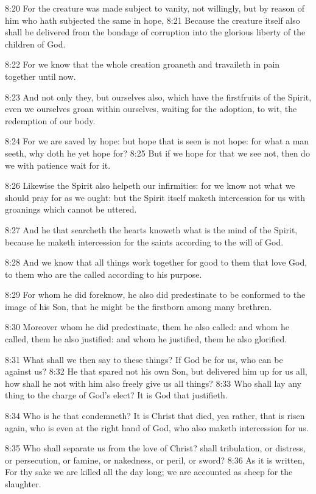 8:20 For the creature was made subject to vanity, not willingly, but
by reason of him who hath subjected the same in hope, 8:21 Because the
creature itself also shall be delivered from the bondage of corruption
into the glorious liberty of the children of God.

8:22 For we know that the whole creation groaneth and travaileth in
pain together until now.

8:23 And not only they, but ourselves also, which have the firstfruits
of the Spirit, even we ourselves groan within ourselves, waiting for
the adoption, to wit, the redemption of our body.

8:24 For we are saved by hope: but hope that is seen is not hope: for
what a man seeth, why doth he yet hope for?  8:25 But if we hope for
that we see not, then do we with patience wait for it.

8:26 Likewise the Spirit also helpeth our infirmities: for we know not
what we should pray for as we ought: but the Spirit itself maketh
intercession for us with groanings which cannot be uttered.

8:27 And he that searcheth the hearts knoweth what is the mind of the
Spirit, because he maketh intercession for the saints according to the
will of God.

8:28 And we know that all things work together for good to them that
love God, to them who are the called according to his purpose.

8:29 For whom he did foreknow, he also did predestinate to be
conformed to the image of his Son, that he might be the firstborn
among many brethren.

8:30 Moreover whom he did predestinate, them he also called: and whom
he called, them he also justified: and whom he justified, them he also
glorified.

8:31 What shall we then say to these things? If God be for us, who can
be against us?  8:32 He that spared not his own Son, but delivered him
up for us all, how shall he not with him also freely give us all
things?  8:33 Who shall lay any thing to the charge of God's elect? It
is God that justifieth.

8:34 Who is he that condemneth? It is Christ that died, yea rather,
that is risen again, who is even at the right hand of God, who also
maketh intercession for us.

8:35 Who shall separate us from the love of Christ? shall tribulation,
or distress, or persecution, or famine, or nakedness, or peril, or
sword?  8:36 As it is written, For thy sake we are killed all the day
long; we are accounted as sheep for the slaughter.

